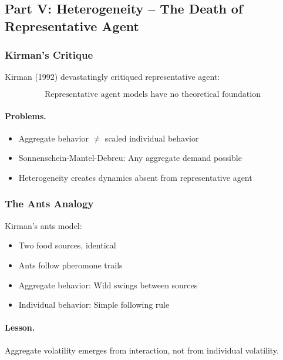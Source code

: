 \subsection{Part V: Heterogeneity – The Death of Representative Agent}

\subsubsection{Kirman's Critique}

Kirman (1992) devastatingly critiqued representative agent:

\begin{equation}
\boxed{
\text{Representative agent models have no theoretical foundation}
}
\label{eq:kirman}
\end{equation}

\paragraph{Problems.}
\begin{itemize}
    \item Aggregate behavior $\neq$ scaled individual behavior
    \item Sonnenschein-Mantel-Debreu: Any aggregate demand possible
    \item Heterogeneity creates dynamics absent from representative agent
\end{itemize}

\subsubsection{The Ants Analogy}

Kirman's ants model:
\begin{itemize}
    \item Two food sources, identical
    \item Ants follow pheromone trails
    \item Aggregate behavior: Wild swings between sources
    \item Individual behavior: Simple following rule
\end{itemize}

\paragraph{Lesson.}
Aggregate volatility emerges from interaction, not from individual volatility.

